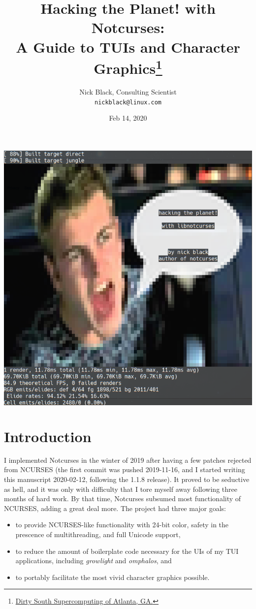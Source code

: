 \documentclass[letterpaper,10pt]{article}
\title{Hacking the Planet! with Notcurses:\\
A Guide to TUIs and Character Graphics\thanks{
 \href{https://www.dsscaw.com/}{Dirty South Supercomputing of Atlanta, GA.}
}\\
}
\author{Nick Black, Consulting Scientist\\
\texttt{nickblack@linux.com}
}
\newenvironment{denseitemize}{
  \begin{itemize}
      \setlength{\itemsep}{0pt}
}{
  \end{itemize}
}
\begin{document}
\date{Feb 14, 2020}
\maketitle
\thispagestyle{fancy}
\date{}
\vspace{1in}
\begin{center}
\includegraphics[width=.75\linewidth]{htp-with-notcurses.png}
\end{center}

\clearpage

\tableofcontents

\clearpage

\section{Introduction}

I implemented Notcurses in the winter of 2019 after having a few patches
rejected from NCURSES (the first commit was pushed 2019-11-16, and I started
writing this manuscript 2020-02-12, following the 1.1.8 release). It proved to
be seductive as hell, and it was only with difficulty that I tore myself away
following three months of hard work. By that time, Notcurses subsumed most
functionality of NCURSES, adding a great deal more. The project had three
major goals:

\begin{denseitemize}
\item  to provide NCURSES-like functionality with 24-bit color, safety in the
    prescence of multithreading, and full Unicode support,
\item to reduce the amount of boilerplate code necessary for the UIs of my
    TUI applications, including \textit{growlight} and \textit{omphalos}, and
\item to portably facilitate the most vivid character graphics possible.
\end{denseitemize}
\end{document}
